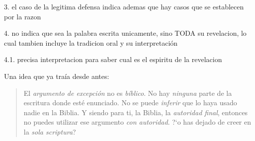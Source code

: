 \documentclass{article}
\begin{document}
3. el caso de la legitima defensa indica ademas que hay casos que se establecen por la razon

4. no indica que sea la palabra escrita unicamente, sino TODA su revelacion, lo cual tambien incluye la tradicion oral y su interpretaci\'on

4.1. precisa interpretacion para saber cual es el espiritu de la revelacion

Una idea que ya tra\'ia desde antes:
\begin{quote}
El \emph{argumento de excepci\'on} no es \emph{b\'{i}blico}. No hay \emph{ninguna} parte de la escritura donde est\'e enunciado. No se puede \emph{inferir} que lo haya usado nadie en la Biblia. Y siendo para ti, la Biblia, la \emph{autoridad final}, entonces no puedes utilizar ese argumento \emph{con autoridad}. ?`o has dejado de creer en la \emph{sola scriptura}?
\end{quote}







\end{document}
